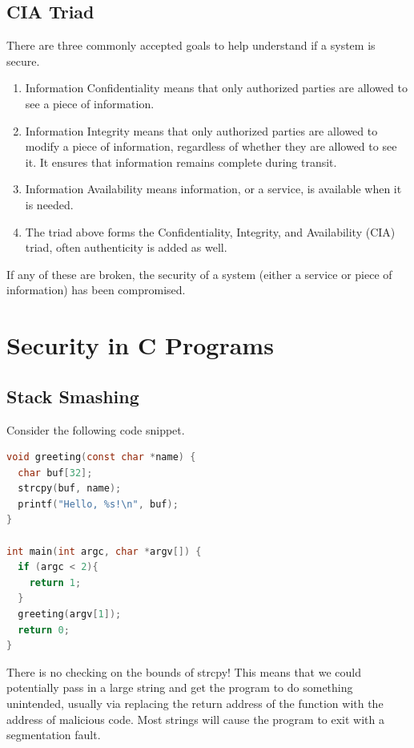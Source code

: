 
\subsection{CIA Triad}

There are three commonly accepted goals to help understand if a system is secure.

\begin{enumerate}
\item Information Confidentiality means that only authorized parties are allowed to see a piece of information.
\item Information Integrity means that only authorized parties are allowed to modify a piece of information, regardless of whether they are allowed to see it.
  It ensures that information remains complete during transit.
\item Information Availability means information, or a service, is available when it is needed.
\item The triad above forms the Confidentiality, Integrity, and Availability (CIA) triad, often authenticity is added as well.
\end{enumerate}

If any of these are broken, the security of a system (either a service or piece of information) has been compromised.

\section{Security in C Programs}

\subsection{Stack Smashing}

Consider the following code snippet.

\begin{lstlisting}[language=C]
void greeting(const char *name) {
  char buf[32];
  strcpy(buf, name);
  printf("Hello, %s!\n", buf);
}

int main(int argc, char *argv[]) {
  if (argc < 2){
    return 1;
  }
  greeting(argv[1]);
  return 0;
}
\end{lstlisting}

There is no checking on the bounds of strcpy!
This means that we could potentially pass in a large string and get the program to do something unintended, usually via replacing the return address of the function with the address of malicious code.
Most strings will cause the program to exit with a segmentation fault.

